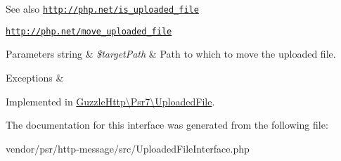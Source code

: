 \begin{DoxySeeAlso}{See also}
\href{http://php.net/is_uploaded_file}{\tt http\+://php.\+net/is\+\_\+uploaded\+\_\+file} 

\href{http://php.net/move_uploaded_file}{\tt http\+://php.\+net/move\+\_\+uploaded\+\_\+file} 
\end{DoxySeeAlso}

\begin{DoxyParams}[1]{Parameters}
string & {\em \$target\+Path} & Path to which to move the uploaded file. \\
\hline
\end{DoxyParams}

\begin{DoxyExceptions}{Exceptions}
{\em } & \\
\hline
\end{DoxyExceptions}


Implemented in \hyperlink{classGuzzleHttp_1_1Psr7_1_1UploadedFile_a5279b64228742deb9e0ba074df4d0d8e}{Guzzle\+Http\textbackslash{}\+Psr7\textbackslash{}\+Uploaded\+File}.



The documentation for this interface was generated from the following file\+:\begin{DoxyCompactItemize}
\item 
vendor/psr/http-\/message/src/Uploaded\+File\+Interface.\+php\end{DoxyCompactItemize}
